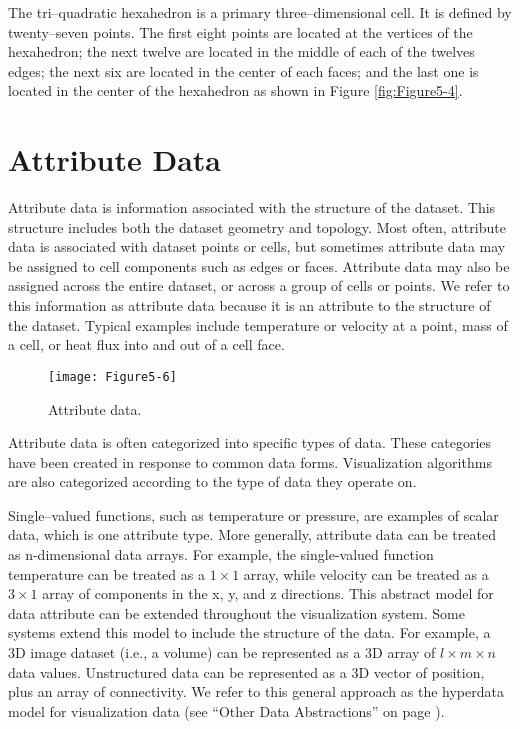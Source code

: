 \begin{description}[leftmargin=0cm,labelindent=0cm]
\item[Tri--Quadratic Hexahedron.\index{cell!tri--quadratic hexahedron}\index{tri--quadratic hexahedron}] The tri--quadratic hexahedron is a primary three--dimensional cell. It is defined by twenty--seven points. The first eight points are located at the vertices of the hexahedron; the next twelve are located in the middle of each of the twelves edges; the next six are located in the center of each faces; and the last one is located in the center of the hexahedron as shown in Figure \ref{fig:Figure5-4}.

\section{Attribute Data}

Attribute data is information associated with the structure of the dataset. This structure includes both the dataset geometry and topology. Most often, attribute data is associated with dataset points or cells, but sometimes attribute data may be assigned to cell components such as edges or faces. Attribute data may also be assigned across the entire dataset, or across a group of cells or points. We refer to this information as attribute data because it is an attribute to the structure of the dataset. Typical examples include temperature or velocity at a point, mass of a cell, or heat flux into and out of a cell face.

\end{description}

\begin{figure}[!htb]
	\centering
	\texttt{[image: Figure5-6]}
	\caption{Attribute data.}
	\label{fig:Figure5-6}
\end{figure}

Attribute data is often categorized into specific types of data. These categories have been created in response to common data forms. Visualization algorithms are also categorized according to the type of data they operate on.

Single--valued functions, such as temperature or pressure, are examples of scalar data, which is one attribute type. More generally, attribute data can be treated as n-dimensional data arrays. For example, the single-valued function temperature can be treated as a $1 \times 1$ array, while velocity can be treated as a $3 \times 1$ array of components in the x, y, and z directions. This abstract model for data attribute can be extended throughout the visualization system. Some systems extend this model to include the structure of the data. For example, a 3D image dataset (i.e., a volume) can be represented as a 3D array of $l \times m \times n$ data values. Unstructured data can be represented as a 3D vector of position, plus an array of connectivity. We refer to this general approach as the hyperdata model for visualization data (see ``Other Data Abstractions'' on page \pageref{sec:other_data_abstractions}).

